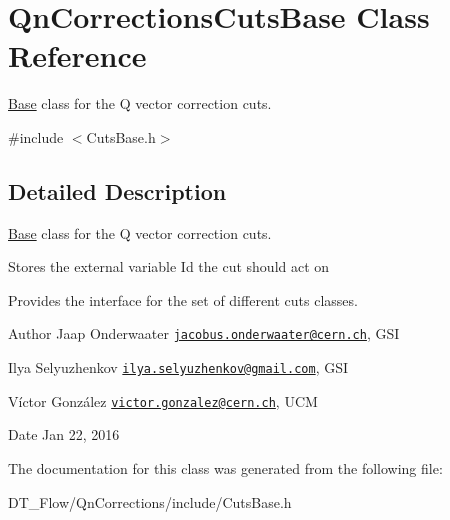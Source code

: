 \hypertarget{classQnCorrectionsCutsBase}{}\section{Qn\+Corrections\+Cuts\+Base Class Reference}
\label{classQnCorrectionsCutsBase}


\mbox{\hyperlink{classBase}{Base}} class for the Q vector correction cuts.  




{\ttfamily \#include $<$Cuts\+Base.\+h$>$}



\subsection{Detailed Description}
\mbox{\hyperlink{classBase}{Base}} class for the Q vector correction cuts. 

Stores the external variable Id the cut should act on

Provides the interface for the set of different cuts classes.

\begin{DoxyAuthor}{Author}
Jaap Onderwaater \href{mailto:jacobus.onderwaater@cern.ch}{\tt jacobus.\+onderwaater@cern.\+ch}, G\+SI 

Ilya Selyuzhenkov \href{mailto:ilya.selyuzhenkov@gmail.com}{\tt ilya.\+selyuzhenkov@gmail.\+com}, G\+SI 

Víctor González \href{mailto:victor.gonzalez@cern.ch}{\tt victor.\+gonzalez@cern.\+ch}, U\+CM 
\end{DoxyAuthor}
\begin{DoxyDate}{Date}
Jan 22, 2016 
\end{DoxyDate}


The documentation for this class was generated from the following file\+:\begin{DoxyCompactItemize}
\item 
D\+T\+\_\+\+Flow/\+Qn\+Corrections/include/Cuts\+Base.\+h\end{DoxyCompactItemize}

